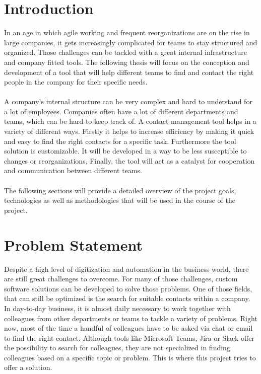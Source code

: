 \newpage
\section{Introduction}
In an age in which agile working and frequent reorganizations are on the rise 
in large companies, it gets increasingly complicated for teams to stay structured 
and organized. Those challenges can be tackled with a great internal infrastructure 
and company fitted tools. The following thesis will focus on the conception and 
development of a tool that will help different teams to find and contact the right 
people in the company for their specific needs.
\\
\\
A company’s internal structure can be very complex and hard to understand for a
lot of employees. Companies often have a lot of different departments and teams, which
can be hard to keep track of. A contact management tool helps in a variety of different
ways. Firstly it helps to increase efficiency by making it quick and easy to find the right
contacts for a specific task. Furthermore the tool solution is customizable. It will be
developed in a way to be less susceptible to changes or reorganizations, Finally, the tool
will act as a catalyst for cooperation and communication between different teams.
\\
\\
The following sections will provide a detailed overview of the project goals, technologies as 
well as methodologies that will be used in the course of the project.

\section{Problem Statement}
Despite a high level of digitization and automation in the business world, there are still 
great challenges to overcome. For many of those challenges, custom software solutions can 
be developed to solve those problems. One of those fields, that can still be optimized is 
the search for suitable contacts within a company. In day-to-day business, it is almost 
daily necessary to work together with colleagues from other departments or teams to tackle 
a variety of problems. Right now, most of the time a handful of colleagues have to be asked
via chat or email to find the right contact. Although tools like Microsoft Teams, Jira or 
Slack offer the possibility to search for colleagues, they are not specialized in finding colleagues
based on a specific topic or problem. This is where this project tries to offer a solution.

